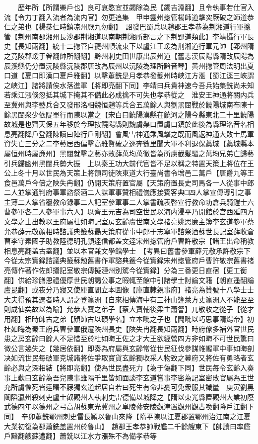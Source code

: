 　　歷年所【所謂樂戶也】良可哀愍宜並蠲除為民【蠲吉淵翻】且令執事若仕官入流【令力丁翻入流者為流内官】勿更追集　甲申靈州揔管楊師道擊突厥破之師道恭仁之弟也【楊㳟仁時鎮凉州厥九勿翻】　詔發巴蜀兵以趙郡王孝恭為荆湘道行軍摠管【荆州南郡湘州長沙郡荆湘道以南朝荆湘所部言之下荆郢道類此】李靖攝行軍長史【長知兩翻】統十二揔管自夔州順流東下以盧江王瑗為荆湘道行軍元帥【郢州隋之竟陵郡瑗于眷翻帥所翻翻】黔州刺史田世康出辰州道【舊志漢辰陽縣隋改辰陽為辰溪縣仍分置沅陵縣沅陵郡唐改為辰州以沅陵為理所黔音琴】黄州揔管周法明出夏口道【夏口即漢口夏戶雅翻】以擊蕭銑是月孝恭發夔州時峽江方漲【蜀江逕三峽謂之峽江】諸將請俟水落進軍【將即亮翻下同】李靖曰兵貴神速今吾兵始集銑尚未知若乘江漲倏忽抵其城下掩其不備此必成擒不可失也孝恭從之　淮安王神通將關内兵至冀州與李藝兵合又發邢洺相魏恒趙等兵合五萬餘人與劉黑闥戰於饒陽城南布陳十餘黑闥衆少依隄單行而陳以當之【宋白曰饒陽漢縣在饒河之陽今縣東北二十里饒陽故城是也齊天保五年移於今理按饒陽縣則魏虜渠口置虜口鎮於此後為縣理洺音名相息亮翻降戶登翻陳讀曰陣行戶剛翻】會風雪神通乘風擊之既而風返神通大敗士馬軍資失亡三分之二李藝居西偏擊高雅賢破之逐奔數里聞大軍不利退保藁城【藁城縣本屬恒州時屬亷州】黑闥就擊之藝亦敗薛萬均萬徹皆為所虜截髪驅之萬均兄弟亡歸藝引兵歸幽州黑闥兵勢大振　上以秦王功大前代官皆不足以稱之特置天策上將位在王公上冬十月以世民為天策上將領司徒陜東道大行臺尚書令增邑二萬戶【唐爵九等王食邑萬戶今倍之陜失冉翻】仍開天策府置官屬【天策府置長史司馬各一人從事中郎二人並掌通判府事軍諮祭酒二人謀軍事贊相禮儀應接賓客典□四人掌宣傳導引之事主薄二人掌省覆教命録事二人記室參軍事二人掌書疏表啓宣行教命功倉兵騎鎧士六曹參軍各二人參軍事六人】以齊王元吉為司空世民以海内浸平乃開館於宫西延四方文學之士出教以王府屬杜如晦記室房玄齡虞世南文學禇亮姚思廉主簿李玄道參軍蔡允恭薛元敬顔相時諮議典籖蘇朂天策府從事中郎于志寧軍諮祭酒蘇世長記室薛收倉曹李守素國子助教陸德明孔頴逹信都盖文逹宋州揔管府戶曹許敬宗【諸王出命稱教相息亮翻盖古盍翻】並以本官兼文學館學士　【考異曰舊書參軍薛元敬承許敬宗下今從太宗實録諮議典籖蘇勉舊書作軍諮典籖今從實録宋州揔管府戶曹許敬宗舊書禇亮傳作著作佐郎攝記室敬宗傳擬漣州别駕今從實録】分為三番更日直宿【更工衡翻】供給珍膳恩禮優厚世民朝謁公事之暇輒至館中引諸學士討論文籍【朝直遥翻論盧昆翻】或夜分乃寢又使庫直閻立本圖像【庫直隸親事府】禇亮為贊號十八學士士大夫得預其選者時人謂之登瀛洲【自來相傳海中有三神山篷萊方丈瀛洲人不能至至則成仙矣故以為喻】允恭大寶之弟子【蔡大寶輔後梁主蕭詧】兀敬收之從子【從才用翻】相時師古之弟【顔師古以碩學名】立本毗之子也【閻毗以巧思事隋煬帝】初杜如晦為秦王府兵曹參軍俄遷陜州長史【陜失冉翻長知兩翻】時府僚多補外官世民患之房玄齡曰餘人不足惜至於杜如晦王佐之才大王欲經營四方非如晦不可世民驚曰微公言幾失之【幾居依翻】即奏為府屬與玄齡常從世民征伐參謀帷幄軍中事如晦剖决如流世民每破軍克城諸將佐爭取寶貨玄齡獨收采人物致之幕府又將佐有勇略者玄齡必與之深相結【將即亮翻】使為世民盡死力【為于偽翻下同】世民每令玄齡入奏事上歎曰玄齡為吾兒陳事雖隔千里皆如面談李玄道嘗事李密為記室密敗官屬為王世充所虜懼死皆逹曙不寐獨玄道起居自若曰死生有命非憂可免衆服其識量　庚寅劉黑闥䧟瀛州殺刺吏盧士叡觀州人執刺史雷德備以城降之【隋以東光縣置觀州大業初廢武德四年以德州之弓高胡蘇東光冀州之阜陵蓚安陵觀津置觀州觀古喚翻降戶江翻下同】　辛卯蕭銑鄂州刺史雷長頴以魯山來降【隋平陳以江夏郡置鄂州治江南之江夏大業初復為郡蕭銑盖置州於魯山】　趙郡王孝恭帥戰艦二千餘艘東下【帥讀曰率艦戶黯翻艘蘇遭翻】蕭銑以江水方漲殊不為備孝恭等